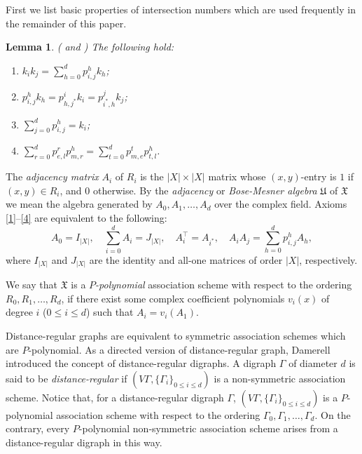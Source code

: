 \documentclass[12pt,a4paper]{amsart}
\makeatletter
\newcommand{\Rmnum}[1]
{\expandafter\@slowromancap\romannumeral #1@}
\newtheorem{lemma}[thm]{Lemma}
\theoremstyle{definition}
\makeatother
\begin{document}
First we list basic properties of intersection numbers which are used frequently in the remainder of this paper.

\begin{lemma}\label{jb}
{\rm (\cite[Proposition 5.1]{ZA99} and \cite[Chapter \Rmnum{2}, Proposition 2.2]{EB84})} The following hold:
\begin{enumerate}
\item\label{jb-1} $k_{i}k_{j}=\sum^{d}_{h=0}p_{i,j}^{h}k_{h}$;
	
\item\label{jb-2}  $p^{h}_{i,j}k_{h}=p^{i}_{h,j^{*}}k_{i}=p^{j}_{i^{*},h}k_{j}$;
		
\item\label{jb-3}  $\sum^{d}_{j=0}p^{h}_{i,j}=k_{i}$;
		
\item\label{jb-4} $\sum^{d}_{r=0}p^{r}_{e,l}p^{h}_{m,r}=\sum^{d}_{t=0}p^{t}_{m,e}p^{h}_{t,l}$.
\end{enumerate}
\end{lemma}

The \emph{adjacency matrix} $A_{i}$ of $R_{i}$ is the $|X|\times |X|$ matrix whose $(x,y)$-entry is $1$ if $(x,y)\in R_{i}$, and $0$ otherwise. By the \emph{adjacency} or \emph{Bose-Mesner algebra} $\mathfrak{U}$ of $\mathfrak{X}$ we mean the algebra generated by $A_0, A_1, \ldots, A_d$ over the complex field. Axioms \ref{1}--\ref{4} are equivalent to the following:
\[
A_0 = I_{|X|}, \quad \sum_{i=0}^d A_i = J_{|X|}, \quad A_i^\top = A_{i^*}, \quad A_i A_j = \sum_{h=0}^d p_{i,j}^h A_h,
\]
where $I_{|X|}$ and $J_{|X|}$ are the identity and all-one matrices of order $|X|$, respectively.

We say that $\mathfrak{X}$ is a \emph{$P$-polynomial} association scheme with respect to the ordering $R_0,R_1,\ldots,R_d$, if there exist some complex coefficient polynomials $v_{i}(x)$ of degree $i$ ($0\leq i\leq d$) such that $A_i=v_{i}(A_1).$

Distance-regular graphs are equivalent to symmetric association schemes which are $P$-polynomial. As a directed version of distance-regular graph, Damerell \cite{RMD81} introduced the concept of distance-regular digraphs. A digraph $\Gamma$ of diameter $d$ is said to be \emph{distance-regular} if $(V\Gamma,\{\Gamma_{i}\}_{0\leq i\leq d})$ is a non-symmetric association scheme. Notice that, for a distance-regular digraph $\Gamma$, $(V\Gamma,\{\Gamma_{i}\}_{0\leq i\leq d})$ is a $P$-polynomial association scheme with respect to the ordering $\Gamma_0,\Gamma_1,\ldots,\Gamma_d$. On the contrary, every $P$-polynomial non-symmetric association scheme arises from a distance-regular digraph in this way.
\end{document}
